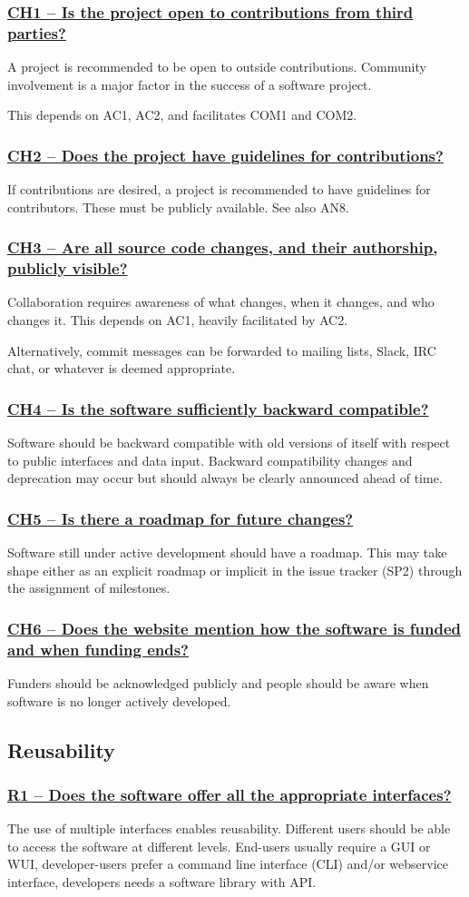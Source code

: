 \documentclass[a4paper,11pt]{article}
\newcommand{\indicator}[1]{\subsubsection*{\underline{#1}}}
\begin{document}
\indicator{CH1 -- Is the project open to contributions from third parties?}

A project is recommended to be open to outside contributions. Community
involvement is a major factor in the success of a software project. 

This depends on AC1, AC2, and facilitates COM1 and COM2. 

\indicator{CH2 -- Does the project have guidelines for contributions?}

If contributions are desired, a project is recommended to have guidelines for
contributors. These must be publicly available.
See also AN8.

\indicator{CH3 -- Are all source code changes, and their authorship, publicly visible?} 

Collaboration requires awareness of what changes, when it changes, and who
changes it. This depends on AC1, heavily facilitated by AC2.

Alternatively, commit messages can be forwarded to mailing lists, Slack, IRC chat, or
whatever is deemed appropriate.

\indicator{CH4 -- Is the software sufficiently backward compatible?}

Software should be backward compatible with old versions of itself with respect
to public interfaces and data input. Backward compatibility changes and
deprecation may occur but should always be clearly announced ahead of time.

\indicator{CH5 -- Is there a roadmap for future changes?}

Software still under active development should have a roadmap. This may take
shape either as an explicit roadmap or implicit in the issue tracker
(SP2) through the assignment of milestones.

\indicator{CH6 -- Does the website mention how the software is funded and
when funding ends?}

Funders should be acknowledged publicly and people should be aware when
software is no longer actively developed.

\subsection{Reusability}

\indicator{R1 -- Does the software offer all the appropriate interfaces?}

The use of multiple interfaces enables reusability. Different users should be
able to access the software at different levels. End-users usually require a
GUI or WUI, developer-users prefer a command line interface (CLI) and/or
webservice interface, developers needs a software library with API.
\end{document}

